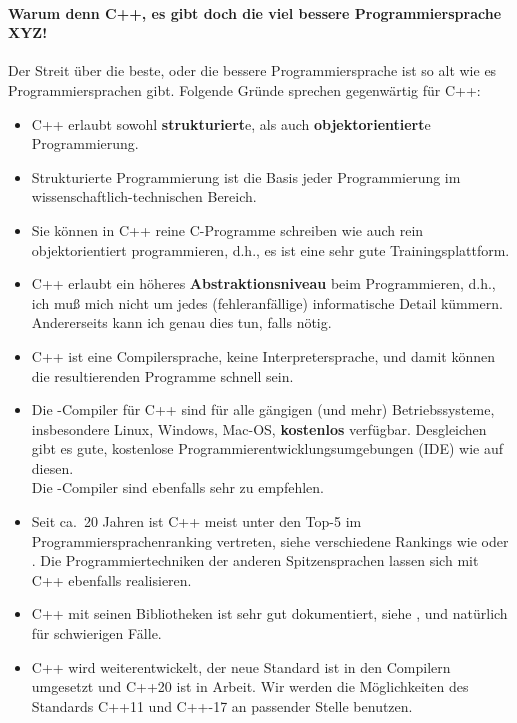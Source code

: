 \paragraph{Warum denn C++, es gibt doch die viel bessere Programmiersprache XYZ!}
Der Streit über die beste, oder die bessere Programmiersprache ist
so alt wie es Programmiersprachen gibt. Folgende Gründe sprechen gegenwärtig für C++:
\begin{itemize}
	\item C++ erlaubt sowohl \textbf{strukturiert}e, als auch \textbf{objektorientiert}e Programmierung.
	\item Strukturierte Programmierung ist die Basis jeder Programmierung im
	 wissenschaftlich-technischen Bereich.
	\item Sie können in C++ reine C-Programme schreiben wie auch rein objektorientiert programmieren,
	d.h., es ist eine sehr gute Trainingsplattform.
	\item C++ erlaubt ein höheres \textbf{Abstraktionsniveau} beim Programmieren, d.h.,
	 ich muß mich nicht um jedes (fehleranfällige) informatische Detail kümmern.
	 Andererseits kann ich genau dies tun, falls nötig.
	\item C++ ist eine Compilersprache, keine Interpretersprache, und damit können
	die resultierenden Programme schnell sein.
	\item Die -Compiler für C++ sind für
	  alle gängigen (und mehr) Betriebssysteme,
	 insbesondere Linux, Windows, Mac-OS, \textbf{kostenlos} verfügbar.
	 Desgleichen gibt es gute, kostenlose Programmierentwicklungsumgebungen (IDE)
	 wie  auf diesen. \\
	 Die -Compiler sind ebenfalls sehr zu empfehlen.
	\item Seit ca.\  20 Jahren ist C++ meist unter den Top-5 im Programmiersprachenranking
	vertreten, siehe  verschiedene Rankings wie
	 oder
	.
    Die Programmiertechniken der anderen Spitzensprachen lassen sich mit C++ ebenfalls realisieren.
    \item C++ mit seinen Bibliotheken ist sehr gut dokumentiert, siehe
    ,  und 
    natürlich  für schwierigen Fälle.
    \item C++ wird weiterentwickelt, der neue
     Standard ist in den
    Compilern umgesetzt und C++20 ist in Arbeit. 
    Wir werden die Möglichkeiten des Standards C++11 und C++-17 an passender Stelle benutzen.
\end{itemize}
%
%
%
\newpage
